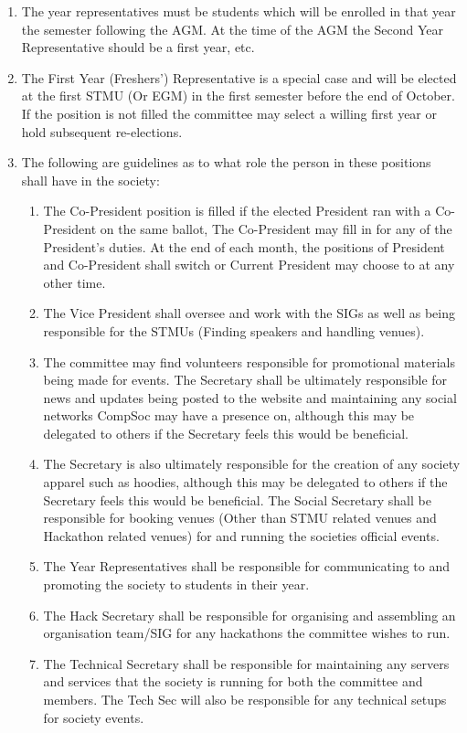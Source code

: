 \begin {enumerate}
  \item The year representatives must be students which will be enrolled in that year the semester
    following the AGM. At the time of the AGM the Second Year Representative should be a first year, etc.

  \item The First Year (Freshers') Representative is a special case and will be elected at the first STMU (Or EGM)
    in the first semester before the end of October. If the position is not filled the committee may select a
    willing first year or hold subsequent re-elections.

  \item The following are guidelines as to what role the person in these positions shall have in the society:
    \begin{enumerate}
      \item The Co-President position is filled if the elected President ran with a Co-President on the same ballot, The Co-President may fill in for any of the President's duties. At the end of each month, the positions of President and Co-President shall switch or Current President may choose to at any other time.
      \item The Vice President shall oversee and work with the SIGs as well as
        being responsible for the STMUs (Finding speakers and handling venues).
      \item The committee may find volunteers responsible for promotional materials
        being made for events. The Secretary shall be ultimately
        responsible for news and updates being posted to the website and
        maintaining any social networks CompSoc may have a presence on,
        although this may be delegated to others if the Secretary feels this
        would be beneficial.
      \item The Secretary is also ultimately responsible for the creation of any
        society apparel such as hoodies, although this may be delegated to others
        if the Secretary feels this would be beneficial. The Social Secretary
        shall be responsible for booking venues (Other than STMU related venues
        and Hackathon related venues) for and running the societies
        official events.
      \item The Year Representatives shall be responsible for communicating to
        and promoting the society to students in their year.
      \item The Hack Secretary shall be responsible for organising and assembling
        an organisation team/SIG for any hackathons the committee wishes to run.
      \item The Technical Secretary shall be responsible for maintaining any servers
        and services that the society is running for both the committee and members.
        The Tech Sec will also be responsible for any technical setups for society events.
    \end{enumerate}


\end{enumerate}
